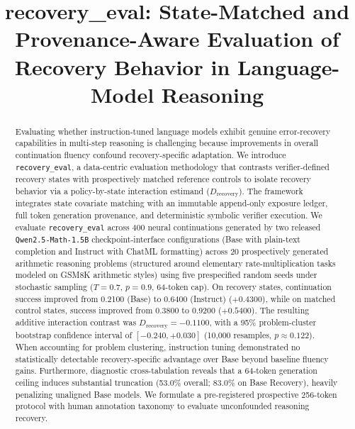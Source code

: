 \documentclass[conference]{IEEEtran}
\begin{document}
\title{recovery\_eval: State-Matched and Provenance-Aware Evaluation of Recovery Behavior in Language-Model Reasoning}

\author{
}

\maketitle

\begin{abstract}
Evaluating whether instruction-tuned language models exhibit genuine error-recovery capabilities in multi-step reasoning is challenging because improvements in overall continuation fluency confound recovery-specific adaptation. We introduce \texttt{recovery\_eval}, a data-centric evaluation methodology that contrasts verifier-defined recovery states with prospectively matched reference controls to isolate recovery behavior via a policy-by-state interaction estimand ($D_{\text{recovery}}$). The framework integrates state covariate matching with an immutable append-only exposure ledger, full token generation provenance, and deterministic symbolic verifier execution. We evaluate \texttt{recovery\_eval} across 400 neural continuations generated by two released \texttt{Qwen2.5-Math-1.5B} checkpoint-interface configurations (Base with plain-text completion and Instruct with ChatML formatting) across 20 prospectively generated arithmetic reasoning problems (structured around elementary rate-multiplication tasks modeled on GSM8K arithmetic styles) using five prespecified random seeds under stochastic sampling ($T=0.7$, $p=0.9$, 64-token cap). On recovery states, continuation success improved from 0.2100 (Base) to 0.6400 (Instruct) ($+0.4300$), while on matched control states, success improved from 0.3800 to 0.9200 ($+0.5400$). The resulting additive interaction contrast was $D_{\text{recovery}} = -0.1100$, with a 95\% problem-cluster bootstrap confidence interval of $[-0.240, +0.030]$ (10,000 resamples, $p \approx 0.122$). When accounting for problem clustering, instruction tuning demonstrated no statistically detectable recovery-specific advantage over Base beyond baseline fluency gains. Furthermore, diagnostic cross-tabulation reveals that a 64-token generation ceiling induces substantial truncation (53.0\% overall; 83.0\% on Base Recovery), heavily penalizing unaligned Base models. We formulate a pre-registered prospective 256-token protocol with human annotation taxonomy to evaluate unconfounded reasoning recovery.
\end{abstract}
\end{document}
